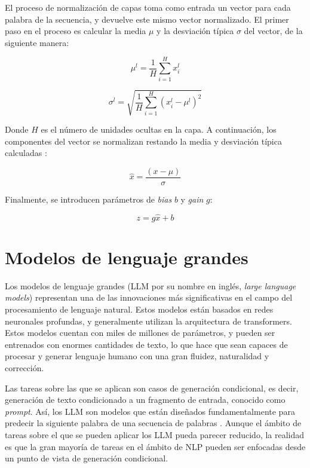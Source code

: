 \documentclass[11pt,spanish,listoffigures,listoftables]{tfgetsinf}
\begin{document}
El proceso de normalización de capas toma como entrada un vector para cada palabra de la secuencia, y devuelve este mismo vector normalizado. El primer paso en el proceso es calcular la media $\mu$ y la desviación típica $\sigma$ del vector, de la siguiente manera:

\begin{equation}
\mu^l = \frac{1}{H} \sum_{i = 1}^Hx_i^l
\end{equation}

\begin{equation}
\sigma^l = \sqrt{\frac{1}{H} \sum_{i = 1}^H (x_i^l - \mu^l)^2}
\end{equation}

Donde $H$ es el número de unidades ocultas en la capa. A continuación, los componentes del vector se normalizan restando la media y desviación típica calculadas \cite{jurafsky2023speech}:

\begin{equation}
\hat{x} = \frac{(x - \mu)}{\sigma}
\end{equation}

Finalmente, se introducen parámetros de \textit{bias} $b$ y \textit{gain} $g$:

\begin{equation}
z = g\hat{x} + b
\end{equation}

\section{Modelos de lenguaje grandes} \label{modelosLenguajeGrandes}

Los modelos de lenguaje grandes (LLM por su nombre en inglés, \textit{large language models}) representan una de las innovaciones más significativas en el campo del procesamiento de lenguaje natural. Estos modelos están basados en redes neuronales profundas, y generalmente utilizan la arquitectura de transformers. Estos modelos cuentan con miles de millones de parámetros, y pueden ser entrenados con enormes cantidades de texto, lo que hace que sean capaces de procesar y generar lenguaje humano con una gran fluidez, naturalidad y corrección.

Las tareas sobre las que se aplican son casos de generación condicional, es decir, generación de texto condicionado a un fragmento de entrada, conocido como \textit{prompt}. Así, los LLM son modelos que están diseñados fundamentalmente para predecir la siguiente palabra de una secuencia de palabras \cite{jurafsky2023speech}. Aunque el ámbito de tareas sobre el que se pueden aplicar los LLM pueda parecer reducido, la realidad es que la gran mayoría de tareas en el ámbito de NLP pueden ser enfocadas desde un punto de vista de generación condicional.
\end{document}
